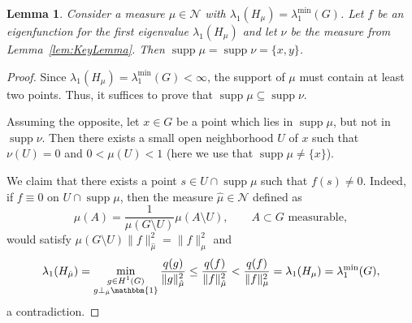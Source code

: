 \documentclass[reqno]{amsart}
\theoremstyle{plain}
\newtheorem{lem}[thm]{Lemma}
\theoremstyle{definition}
\theoremstyle{remark}
\numberwithin{equation}{section}
\newcommand{\cN}{\mathcal{N}}
\newcommand{\one}{\mathbbm{1}}
\newcommand{\supp}{\operatorname{supp}}
\begin{document}
\begin{lem} \label{lem:AuxiliaryFormOfMinimizingMeasure}
	Consider a measure $\mu \in \cN$ with $\lambda_1(H_\mu) = \lambda_1^{\min}(G)$. Let $f$ be an eigenfunction for the first eigenvalue $\lambda_1(H_\mu)$ and let $\nu$ be the measure from Lemma~\ref{lem:KeyLemma}. Then $\supp\mu = \supp\nu =\{x,y\}$.
	
\end{lem}

\begin{proof}
	Since $\lambda_1(H_\mu) = \lambda_1^{\min}(G) < \infty$, the support of $\mu$ must contain at least two points. Thus, it suffices to prove that $\supp\mu \subseteq \supp\nu$.
	
	Assuming the opposite, let $x \in G$ be a point which lies in $\supp\mu$, but not in $\supp \nu$. Then there exists a small open neighborhood $U$ of $x$ such that $\nu(U) =  0$ and $0  < \mu(U) < 1$ (here we use that $\supp\mu  \neq \{x \}$).
	
	We claim that there exists a point $s \in U  \cap \supp \mu$ such that $f(s)\neq 0$. Indeed, if $f \equiv 0$ on $ U  \cap \supp \mu$, then the measure $\hat \mu \in \cN$ defined as
	\[
	\hat\mu(A) = \frac{1}{\mu(G \setminus U )} \mu (A \setminus U  ), \qquad \text{$A \subset  G$ measurable},
	\]
	would satisfy $\mu(G \setminus U ) \|f\|^2_{\hat \mu}  =  \|f\|^2_{\mu}$ and
	\begin{align*}
		\lambda_1(H_{\hat \mu}) = \min_{\substack{g \in H^1(G) \\g \perp_{\hat \mu} \one}} \frac{q(g)}{\|g\|_{\hat\mu}^2 }
		\le  \frac{q(f)}{\|f\|_{\hat\mu}^2 } < \frac{q(f)}{\|f\|_{\mu}^2 }  = \lambda_1(H_\mu)  = \lambda_1^{\min} (G),
	\end{align*}
	a contradiction.
	

\end{proof}
\end{document}
